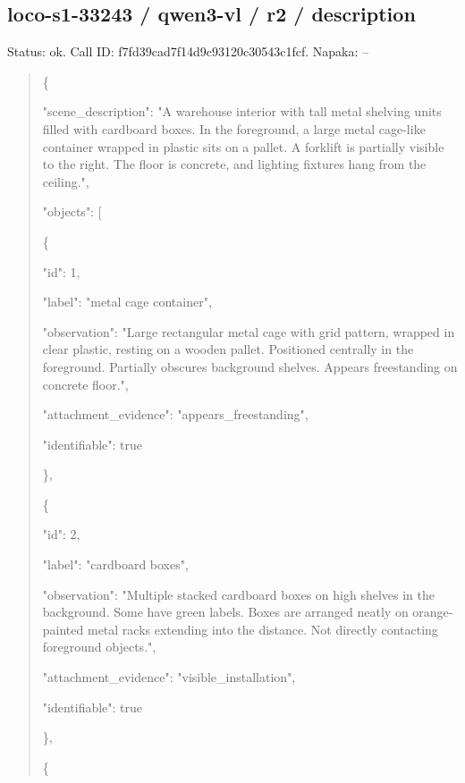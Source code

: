 \documentclass[10pt,a4paper]{article}
\begin{document}
\subsection*{loco-s1-33243 / qwen3-vl / r2 / description}
Status: ok. Call ID: f7fd39cad7f14d9c93120c30543c1fcf. Napaka: --
\begin{quote}\footnotesize
\{\par
  "scene\_description":\allowbreak{} "A warehouse interior with tall metal shelving units filled with cardboard boxes. In the foreground,\allowbreak{} a large metal cage-like container wrapped in plastic sits on a pallet. A forklift is partially visible to the right. The floor is concrete,\allowbreak{} and lighting fixtures hang from the ceiling.",\allowbreak{}\par
  "objects":\allowbreak{} [\par
    \{\par
      "id":\allowbreak{} 1,\allowbreak{}\par
      "label":\allowbreak{} "metal cage container",\allowbreak{}\par
      "observation":\allowbreak{} "Large rectangular metal cage with grid pattern,\allowbreak{} wrapped in clear plastic,\allowbreak{} resting on a wooden pallet. Positioned centrally in the foreground. Partially obscures background shelves. Appears freestanding on concrete floor.",\allowbreak{}\par
      "attachment\_evidence":\allowbreak{} "appears\_freestanding",\allowbreak{}\par
      "identifiable":\allowbreak{} true\par
    \},\allowbreak{}\par
    \{\par
      "id":\allowbreak{} 2,\allowbreak{}\par
      "label":\allowbreak{} "cardboard boxes",\allowbreak{}\par
      "observation":\allowbreak{} "Multiple stacked cardboard boxes on high shelves in the background. Some have green labels. Boxes are arranged neatly on orange-painted metal racks extending into the distance. Not directly contacting foreground objects.",\allowbreak{}\par
      "attachment\_evidence":\allowbreak{} "visible\_installation",\allowbreak{}\par
      "identifiable":\allowbreak{} true\par
    \},\allowbreak{}\par
    \{\par

\end{quote}
\end{document}
